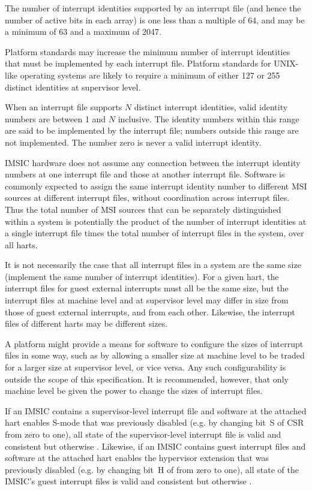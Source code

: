The number of interrupt identities supported by an interrupt file
(and hence the number of active bits in each array) is one less than a
multiple of 64, and may be a minimum of 63 and a maximum of 2047.

\begin{commentary}
Platform standards may increase the minimum number of interrupt
identities that must be implemented by each interrupt file.
Platform standards for UNIX-like operating systems are likely
to require a minimum of either 127 or 255 distinct identities at
supervisor level.
\end{commentary}

When an interrupt file supports $N$ distinct interrupt identities,
valid identity numbers are between 1 and $N$ inclusive.
The identity numbers within this range are said to be implemented by
the interrupt file;
numbers outside this range are not implemented.
The number zero is never a valid interrupt identity.

IMSIC hardware does not assume any connection between the interrupt
identity numbers at one interrupt file and those at another interrupt
file.
Software is commonly expected to assign the same interrupt identity
number to different MSI sources at different interrupt files, without
coordination across interrupt files.
Thus the total number of MSI sources that can be separately
distinguished within a system is potentially the product of the number
of interrupt identities at a single interrupt file times the total
number of interrupt files in the system, over all harts.

It is not necessarily the case that all interrupt files in a system are
the same size (implement the same number of interrupt identities).
For a given hart, the interrupt files for guest external interrupts
must all be the same size, but the interrupt files at machine level
and at supervisor level may differ in size from those of guest external
interrupts, and from each other.
Likewise, the interrupt files of different harts may be different
sizes.

A platform might provide a means for software to configure the sizes
of interrupt files in some way, such as by allowing a smaller size at
machine level to be traded for a larger size at supervisor level, or
vice versa.
Any such configurability is outside the scope of this specification.
It is recommended, however, that only machine level be given the power
to change the sizes of interrupt files.

If an IMSIC contains a supervisor-level interrupt file and software at
the attached hart enables \mbox{S-mode} that was previously disabled
(e.g. by changing bit~S of CSR  from zero to one), all state
of the supervisor-level interrupt file is valid and consistent but
otherwise {\unspecified}.
Likewise, if an IMSIC contains guest interrupt files and software at
the attached hart enables the hypervisor extension that was previously
disabled (e.g. by changing bit~H of  from zero to one), all
state of the IMSIC's guest interrupt files is valid and consistent but
otherwise {\unspecified}.

